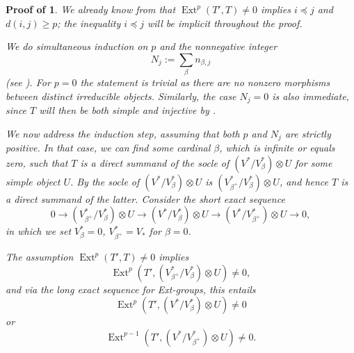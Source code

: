 \documentclass[11pt]{article}
\theoremstyle{plain}
\theoremstyle{nonumberplain}
\theoremstyle{plain}
\theoremstyle{nonumberplain}
\newtheorem{proof-of-exts}{Proof of \Cref{th.exts}}
\newcommand\cS{\mathcal S}
\DeclareMathOperator{\ext}{\mathrm{Ext}}
\begin{document}
\begin{proof-of-exts}
  We already know from  that $\ext^p(T',T)\neq 0$ implies $i {\preceq} j$ and
  $d(i,j)\ge p$; the inequality $i\preceq j$ will be implicit throughout the proof.



  We do simultaneous induction on $p$ and the nonnegative integer
\begin{equation}\label{eq:ind-number}
  N_j:=\sum_{\beta}n_{\beta,j}
\end{equation}
(see ). For $p=0$ the statement is trivial as
there are no nonzero morphisms between distinct irreducible
objects. Similarly, the case $N_j=0$ is also immediate, since $T$ will
then be both simple and injective by .

We now address the induction step, assuming that both $p$ and $N_j$
are strictly positive. In that case, we can find some cardinal
$\beta$, which is infinite or equals zero, such that $T$ is a direct
summand of the socle of $(V^*/V_\beta^*)\otimes U$ for some simple
object $U$.   By  the socle of $(V^*/V_\beta^*)\otimes U$ is
$(V^*_{\beta^+}/V^*_\beta)\otimes U$, and hence $T$ is a direct summand of
the latter.  Consider the short
exact sequence
\begin{equation}\label{eq:seq}
  0\to (V^*_{\beta^+}/V^*_\beta)\otimes U \to (V^*/V_\beta^*)\otimes U\to (V^*/V_{\beta^+}^*)\otimes U\to 0,
\end{equation}
in which we set $V_\beta^*=0$, $V_{\beta^+}^*=V_*$ for $\beta=0$.



The assumption $\ext^p(T',T)\ne 0$ implies
\begin{equation*}
  \ext^p(T',(V^*_{\beta^+}/V^*_\beta)\otimes U)\ne 0,
\end{equation*}
and via the long exact sequence for Ext-groups, this entails
\begin{equation}\label{eq:p}
  \ext^p(T',(V^*/V_\beta^*)\otimes U)\ne 0
\end{equation}
or 
\begin{equation}\label{eq:p-1}
  \ext^{p-1}(T',(V^*/V_{\beta^+}^*)\otimes U)\ne 0.
\end{equation}


\end{proof-of-exts}
\end{document}
